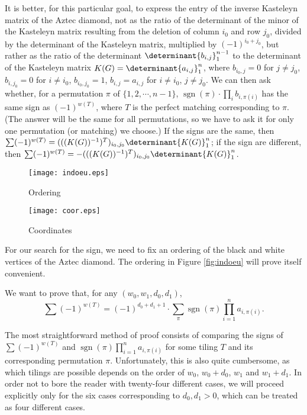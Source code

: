 \documentclass[10pt,reqno]{amsart}
\theoremstyle{plain}
\theoremstyle{definition}
\theoremstyle{remark}
\DeclareMathOperator{\sgn }{sgn }
\begin{document}
It is better, for this particular goal, to
express the entry of the inverse Kasteleyn matrix of the Aztec diamond, 
not as the ratio of the determinant of the minor of the Kasteleyn matrix
resulting from the deletion of 
column $i_0$ and row $j_0$, divided by the determinant of the Kasteleyn
matrix, multiplied by $(-1)^{i_0+j_0}$, but rather as the ratio
of the determinant $\determinant{b_{i,j}}_1^{n-1}$ to the determinant of the
Kasteleyn matrix $K(G) = \determinant{a_{i,j}}_1^n$, where $b_{i_0,j}=0$
for $j\ne j_0$, $b_{i,j_0}=0$ for $i\ne i_0$, $b_{i_0,j_0}=1$,
$b_{i,j}=a_{i,j}$ for $i\ne i_0$, $j\ne j_0$. We can then ask whether,
for a permutation $\pi $ of $\{1,2,\dotsb ,n-1\}$, 
$\sgn(\pi ) \cdot \prod_{i} b_{i,\pi(i)}$
has the same sign as $(-1)^{w(T)}$, where $T$ is the perfect matching 
corresponding to $\pi$. (The answer will be the same for all permutations, 
so we have to ask it for only one permutation (or matching) we choose.)
If the signs are the same, then
$\sum (-1)^{w(T)} = 
(((K(G))^{-1})^T)_{i_0,j_0} \determinant{K(G)}_1^n$; if
the sign are different, then
$\sum (-1)^{w(T)} = 
- (((K(G))^{-1})^T)_{i_0,j_0} \determinant{K(G)}_1^n$.

\begin{figure}
        \begin{minipage}[b]{0.5\linewidth}
                \centering \texttt{[image: indoeu.eps]}
                \caption{Ordering}\label{fig:indoeu}
        \end{minipage}%
        \begin{minipage}[b]{0.5\linewidth}
                \texttt{[image: coor.eps]}
                \caption{Coordinates} \label{fig:coor}   
        \end{minipage}%
\end{figure}

For our search for the sign, we need to fix an ordering of the black and
white vertices of the Aztec diamond. The ordering in Figure
\ref{fig:indoeu} will prove itself convenient.

We want to prove that, for any $(w_0,w_1,d_0,d_1)$, 
\[
\sum (-1)^{w(T)} = (-1)^{d_0+d_1+1}\cdot 
\sum_{\pi } \sgn(\pi ) \prod_{i=1}^n a_{i,\pi(i)}. \label{eq:mandrake}
\]

The most straightforward method of proof consists of comparing the signs
of $\sum (-1)^{w(T)}$ and $\sgn(\pi ) \prod_{i=1}^n a_{i,\pi(i)}$ for
some tiling $T$ and its corresponding permutation $\pi $. Unfortunately,
this is also quite cumbersome, as which tilings are possible depends
on the order of $w_0$, $w_0+d_0$, $w_1$ and $w_1+d_1$. In order not to
bore the reader with twenty-four different cases, we will proceed
explicitly only for the six cases corresponding to $d_0,d_1>0$, which
can be treated as four different cases.
\end{document}
